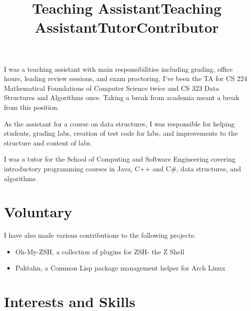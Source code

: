 \documentclass[margintitle,line]{res}
\renewcommand{\subsection}[1]{\section{\normalfont #1}}
\begin{document}
\begin{resume}
\title{Teaching Assistant}
\begin{position}
 I was a teaching assistant with main responsibilities including grading, office hours, leading review sessions, and exam proctoring. I've been the TA for CS 224 Mathematical Foundations of Computer Science twice  and CS 323 Data Structures and Algorithms once. Taking a break from academia meant a break from this position.
\end{position}

\title{Teaching Assistant}
\begin{position}
 As the assistant for a course on data structures, I was responsible for helping students, grading labs, creation of test code for labs, and improvements to the structure and content of labs.
\end{position}

\title{Tutor}
\begin{position}
I was a tutor for the School of Computing and Software Engineering covering introductory programming courses in Java, C++ and C\#, data structures, and algorithms.
\end{position}

%
\subsection{Voluntary}

\title{Contributor}
\begin{position}
I have also made various contributions to the following projects:
\begin{itemize}
\item{Oh-My-ZSH, a collection of plugins for ZSH- the Z Shell}
\item{Paktahn, a Common Lisp package management helper for Arch Linux}
\end{itemize}
\end{position}


\section{Interests and Skills}


\end{resume}
\end{document}
